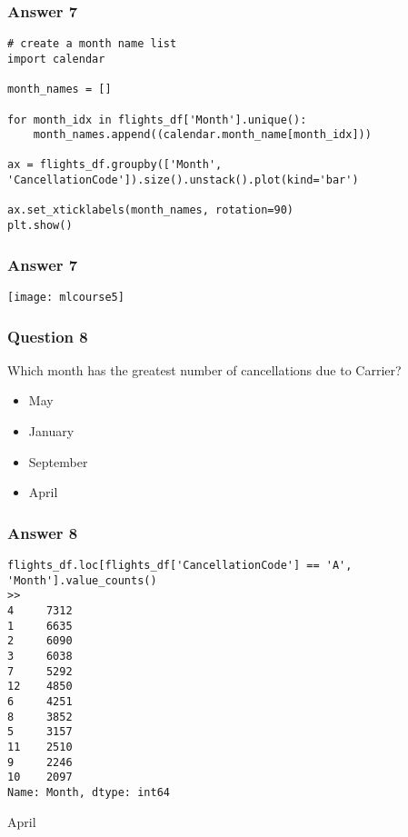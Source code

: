 \begin{frame}[fragile]\frametitle{Answer 7}
\begin{lstlisting}
# create a month name list
import calendar

month_names = []

for month_idx in flights_df['Month'].unique():
    month_names.append((calendar.month_name[month_idx]))
    
ax = flights_df.groupby(['Month', 'CancellationCode']).size().unstack().plot(kind='bar')

ax.set_xticklabels(month_names, rotation=90)
plt.show()
\end{lstlisting}

\end{frame}

\begin{frame}[fragile]\frametitle{Answer 7}
\begin{center}
\texttt{[image: mlcourse5]}
\end{center}

\end{frame}


\begin{frame}[fragile]\frametitle{Question 8}
Which month has the greatest number of cancellations due to Carrier?
\begin{itemize}
\item May
\item January
\item September
\item April
\end{itemize}

\end{frame}

\begin{frame}[fragile]\frametitle{Answer 8}
\begin{lstlisting}
flights_df.loc[flights_df['CancellationCode'] == 'A', 'Month'].value_counts()
>>
4     7312
1     6635
2     6090
3     6038
7     5292
12    4850
6     4251
8     3852
5     3157
11    2510
9     2246
10    2097
Name: Month, dtype: int64
\end{lstlisting}
April
\end{frame}

